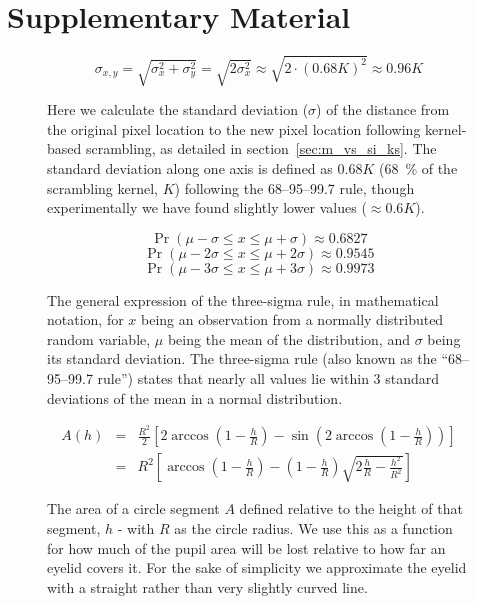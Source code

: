 \chapter{Supplementary Material}
    \begin{figure}[H]
	\[ \sigma_{x,y} = \sqrt{\sigma_{x}^{2}+\sigma_{y}^{2}} = \sqrt{2\sigma_{x}^{2}} \approx \sqrt{2 \cdot (0.68 K)^{2}} \approx 0.96K\]
	\caption{Here we calculate the standard deviation ($\sigma$) of the distance from the original pixel location to the new pixel location following kernel-based scrambling, as detailed in section~\ref{sec:m_vs_si_ks}. The standard deviation along one axis is defined as $0.68K$ (\SI{68}{\percent} of the scrambling kernel, $K$) following the 68–95–99.7 rule, though experimentally we have found slightly lower values ($\approx 0.6K$).}
	\label{eq:lrgn}
    \end{figure}
    \begin{figure}[H]
	\[\Pr(\mu - \sigma \le x \le \mu + \sigma) \approx 0.6827 \]
	\[\Pr(\mu - 2\sigma \le x \le \mu + 2\sigma) \approx 0.9545 \]
	\[\Pr(\mu - 3\sigma \le x \le \mu + 3\sigma) \approx 0.9973 \]
	\caption{The general expression of the three-sigma rule, in mathematical notation, for $x$ being an observation from a normally distributed random variable, $\mu$ being the mean of the distribution, and $\sigma$ being its standard deviation. The three-sigma rule (also known as the “68–95–99.7 rule”) states that nearly all values lie within 3 standard deviations of the mean in a normal distribution.}
	\label{eq:3s}
    \end{figure}
    \begin{figure}[H]
	\begin{eqnarray*}
	    A(h)&=&\frac{R^2}{2}\left[2\arccos\left(1-\frac{h}{R}\right) - \sin\left(2 \arccos\left(1-\frac{h}{R}\right)\right) \right]\\
	    &=&R^2 \left [\arccos{\left (1-\frac{h}{R}\right)} - \left (1-\frac{h}{R}\right) \sqrt{2 \frac{h}{R} - \frac{h^2}{R^2}} \right]
	\end{eqnarray*}
	\caption{The area of a circle segment $A$ defined relative to the height of that segment, $h$ - with $R$ as the circle radius. We use this as a function for how much of the pupil area will be lost relative to how far an eyelid covers it. For the sake of simplicity we approximate the eyelid with a straight rather than very slightly curved line.}
	\label{eq:cs}
    \end{figure}
    \clearpage
